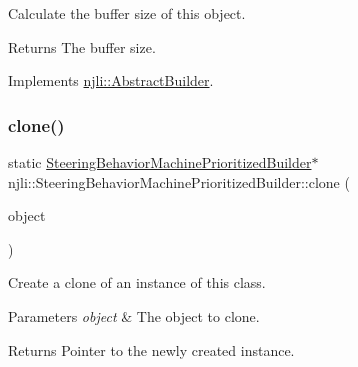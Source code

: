 Calculate the buffer size of this object.

\begin{DoxyReturn}{Returns}
The buffer size. 
\end{DoxyReturn}


Implements \mbox{\hyperlink{classnjli_1_1_abstract_builder_aa1d220053e182c37b31b427499c6eacf}{njli\+::\+Abstract\+Builder}}.

\mbox{\label{classnjli_1_1_steering_behavior_machine_prioritized_builder_a4d7150d424e3dd59787eefcd1e173b84}} 
\subsubsection{\texorpdfstring{clone()}{clone()}}
{\footnotesize\ttfamily static \mbox{\hyperlink{classnjli_1_1_steering_behavior_machine_prioritized_builder}{Steering\+Behavior\+Machine\+Prioritized\+Builder}}$\ast$ njli\+::\+Steering\+Behavior\+Machine\+Prioritized\+Builder\+::clone (\begin{DoxyParamCaption}\item[{const \mbox{\hyperlink{classnjli_1_1_steering_behavior_machine_prioritized_builder}{Steering\+Behavior\+Machine\+Prioritized\+Builder}} \&}]{object }\end{DoxyParamCaption})\hspace{0.3cm}{\ttfamily [static]}}

Create a clone of an instance of this class.


\begin{DoxyParams}{Parameters}
{\em object} & The object to clone.\\
\hline
\end{DoxyParams}
\begin{DoxyReturn}{Returns}
Pointer to the newly created instance. 
\end{DoxyReturn}
\mbox{\label{classnjli_1_1_steering_behavior_machine_prioritized_builder_aecab02d27de311aea38bebc4f35ebea1}} 
